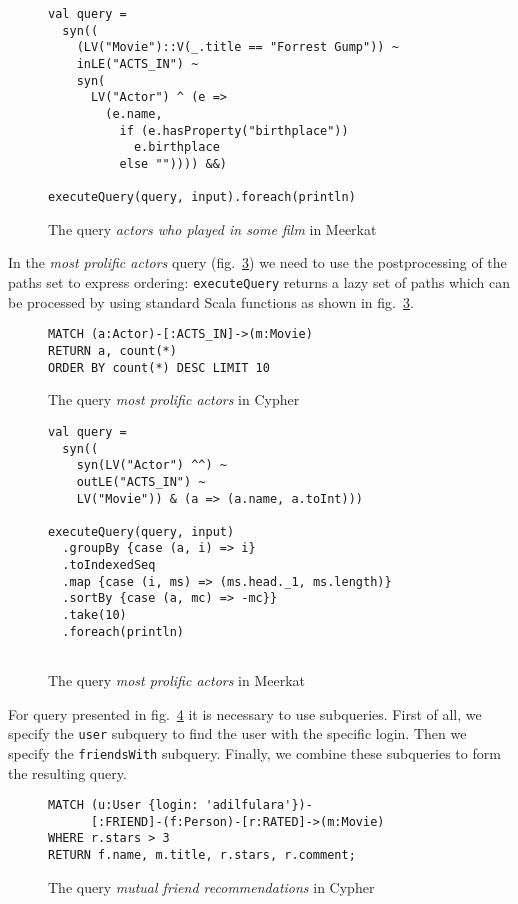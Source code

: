 \begin{figure}[h]
\begin{lstlisting}
val query = 
  syn((
    (LV("Movie")::V(_.title == "Forrest Gump")) ~ 
    inLE("ACTS_IN") ~
    syn(
      LV("Actor") ^ (e => 
        (e.name,
          if (e.hasProperty("birthplace")) 
            e.birthplace 
          else "")))) &&)
 
executeQuery(query, input).foreach(println)
\end{lstlisting}
\caption{The query \emph{actors who played in some film} in Meerkat}
\label{fig:Q1_M}
\end{figure}


In the \emph{most prolific actors} query (fig.~\ref{fig:Q2_C}) we need to use the postprocessing of the paths set to express ordering: \lstinline{executeQuery} returns a lazy set of paths which can be processed by using standard Scala functions as shown in fig.~\ref{fig:Q2_C}.

\begin{figure}[h]
\begin{lstlisting}
MATCH (a:Actor)-[:ACTS_IN]->(m:Movie)
RETURN a, count(*)
ORDER BY count(*) DESC LIMIT 10
\end{lstlisting}
\caption{The query \emph{most prolific actors} in Cypher}
\label{fig:Q2_C}
\end{figure}


\begin{figure}[h]
\begin{lstlisting}
val query = 
  syn((
    syn(LV("Actor") ^^) ~ 
    outLE("ACTS_IN") ~ 
    LV("Movie")) & (a => (a.name, a.toInt)))
 
executeQuery(query, input)
  .groupBy {case (a, i) => i}
  .toIndexedSeq
  .map {case (i, ms) => (ms.head._1, ms.length)}
  .sortBy {case (a, mc) => -mc}}
  .take(10)
  .foreach(println)
  
\end{lstlisting}
\caption{The query \emph{most prolific actors} in Meerkat}
\label{fig:Q2_C}
\end{figure}

For query presented in fig.~\ref{fig:Q4_C} it is necessary to use subqueries.
First of all, we specify the \lstinline{user} subquery to find the user with the specific login.
Then we specify the \lstinline{friendsWith} subquery.
Finally, we combine these subqueries to form the resulting query.

\begin{figure}[h]
\begin{lstlisting}
MATCH (u:User {login: 'adilfulara'})-
      [:FRIEND]-(f:Person)-[r:RATED]->(m:Movie)
WHERE r.stars > 3
RETURN f.name, m.title, r.stars, r.comment;
\end{lstlisting}
\caption{The query \emph{mutual friend recommendations} in Cypher}
\label{fig:Q4_C}
\end{figure}


